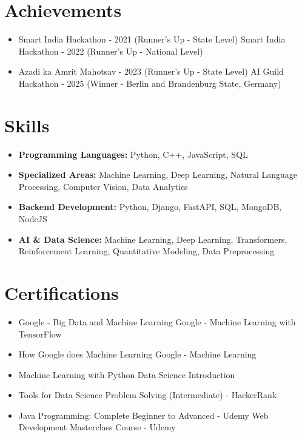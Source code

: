 \documentclass[a4paper,10pt]{article}
\begin{document}
\section*{Achievements}
\begin{itemize}
\item Smart India Hackathon - 2021 (Runner's Up - State Level) \hfill Smart India Hackathon - 2022 (Runner's Up - National Level)
\item Azadi ka Amrit Mahotsav - 2023 (Runner's Up - State Level) \hfill AI Guild Hackathon - 2025 (Winner - Berlin and Brandenburg State, Germany)
\end{itemize}

\section*{Skills}
\begin{itemize}
  \item \textbf{Programming Languages:} Python, C++, JavaScript, SQL
  \item \textbf{Specialized Areas:} Machine Learning, Deep Learning, Natural Language Processing, Computer Vision, Data Analytics
  \item \textbf{Backend Development:} Python, Django, FastAPI, SQL, MongoDB, NodeJS
  \item \textbf{AI \& Data Science:} Machine Learning, Deep Learning, Transformers, Reinforcement Learning, Quantitative Modeling, Data Preprocessing
\end{itemize}

\section*{Certifications}
\begin{itemize}
\item Google - Big Data and Machine Learning \hfill Google - Machine Learning with TensorFlow
\item How Google does Machine Learning \hfill Google - Machine Learning
\item Machine Learning with Python \hfill Data Science Introduction
\item Tools for Data Science \hfill Problem Solving (Intermediate) - HackerRank
\item Java Programming: Complete Beginner to Advanced - Udemy \hfill Web Development Masterclass Course - Udemy
\end{itemize}
\end{document}
